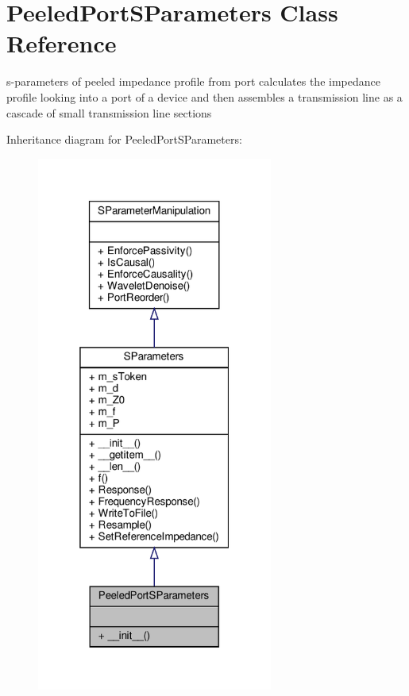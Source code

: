 \hypertarget{classSignalIntegrity_1_1ImpedanceProfile_1_1PeeledPortSParameters_1_1PeeledPortSParameters}{}\section{Peeled\+Port\+S\+Parameters Class Reference}
\label{classSignalIntegrity_1_1ImpedanceProfile_1_1PeeledPortSParameters_1_1PeeledPortSParameters}


s-\/parameters of peeled impedance profile from port calculates the impedance profile looking into a port of a device and then assembles a transmission line as a cascade of small transmission line sections  




Inheritance diagram for Peeled\+Port\+S\+Parameters\+:
\nopagebreak
\begin{figure}[H]
\begin{center}
\leavevmode
\includegraphics[width=220pt]{classSignalIntegrity_1_1ImpedanceProfile_1_1PeeledPortSParameters_1_1PeeledPortSParameters__inherit__graph}
\end{center}
\end{figure}


